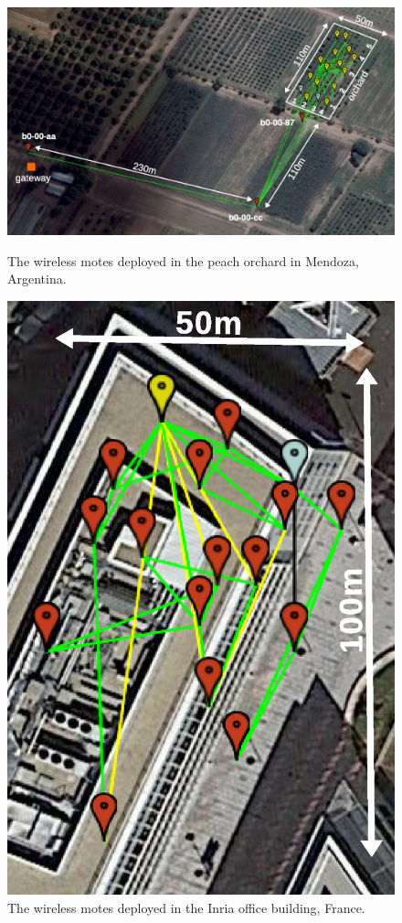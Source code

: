 \documentclass{elsarticle}
\begin{document}
\begin{figure}
    \begin{minipage}[b]{0.66\textwidth}
        \centering
        \includegraphics[width=\textwidth]{map_annotated}
        \caption{The wireless motes deployed in the peach orchard in Mendoza, Argentina.\newline}
        \label{fig:map}
    \end{minipage}
    \hfill
    \begin{minipage}[b]{0.3\textwidth}
        \includegraphics[width=\textwidth]{evalab_map_annotated.eps}
        \caption{The wireless motes deployed in the Inria office building, France.}
    \end{minipage}
\end{figure}
\end{document}
